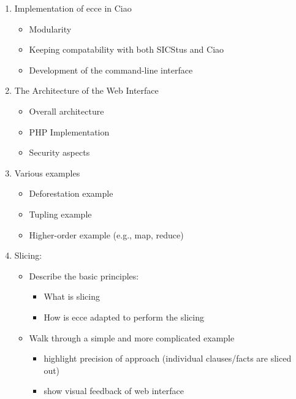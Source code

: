 \documentclass{sig-alternate}
\begin{document}
\begin{enumerate}
  \item Implementation of {\sc ecce} in Ciao
    \begin{itemize}
    \item Modularity
    \item Keeping compatability with both SICStus and Ciao
    \item Development of the command-line interface
   \end{itemize}
  
  \item The Architecture of the Web Interface
    \begin{itemize}
    \item Overall architecture
    \item PHP Implementation
    \item Security aspects
  \end{itemize}
      
 \item Various examples
     \begin{itemize}
    \item Deforestation example
    \item Tupling example
    \item Higher-order example (e.g., map, reduce)
  \end{itemize}
  
   \item Slicing:
     \begin{itemize}
    \item Describe the basic principles:
       \begin{itemize}
    \item What is slicing
    \item How is {\sc ecce} adapted to perform the slicing
    \end{itemize}
    \item Walk through a simple and more complicated example
    \begin{itemize}
    \item 
     highlight precision of approach (individual clauses/facts
     are sliced out)
     \item show visual feedback of web interface
    \end{itemize}
    \end{itemize}
  

\end{enumerate}
\end{document}

